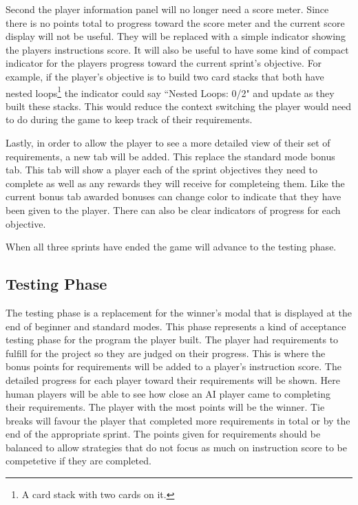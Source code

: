 Second the player information panel will no longer need a score meter. Since there
is no points total to progress toward the score meter and the current score display
will not be useful. They will be replaced with a simple indicator showing the
players instructions score. It will also be useful to have some kind of compact
indicator for the players progress toward the current sprint's objective. For example,
if the player's objective is to build two card stacks that both have nested
loops\footnote{A card stack with two \R cards on it.} the indicator could say
``Nested Loops: 0/2" and update as they built these stacks. This would reduce
the context switching the player would need to do during the game to keep track of
their requirements.

Lastly, in order to allow the player to see a more detailed view of their set of
requirements, a new tab will be added. This replace the standard mode bonus tab.
This tab will show a player each of the sprint objectives they need to complete
as well as any rewards they will receive for completeing them. Like the current
bonus tab awarded bonuses can change color to indicate that they have been given
to the player. There can also be clear indicators of progress for each objective.

When all three sprints have ended the game will advance to the testing phase.

\subsection{Testing Phase}
The testing phase is a replacement for the winner's modal that is displayed at
the end of beginner and standard modes. This phase represents a kind of acceptance
testing phase for the program the player built. The player had requirements to
fulfill for the project so they are judged on their progress. This is where the
bonus points for requirements will be added to a player's instruction score. The
detailed progress for each player toward their requirements will be shown. Here
human players will be able to see how close an AI player came to completing their
requirements. The player with the most points will be the winner. Tie breaks will
favour the player that completed more requirements in total or by the end of the
appropriate sprint. The points given for requirements should be balanced to allow
strategies that do not focus as much on instruction score to be competetive if
they are completed.


